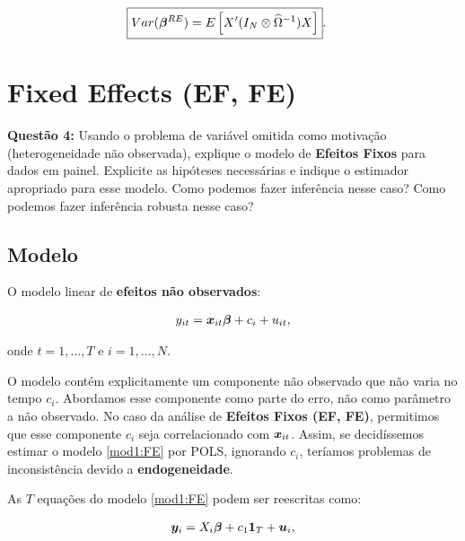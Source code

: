 \documentclass[11pt,oneside,a4paper]{article}
\numberwithin{equation}{section}
\begin{document}
\vspace{-1 em}
\begin{align*} 
	\Aboxed{
Var( \mbs{\beta}^{RE} ) = 
E
\left[ X' ( I_{N} \otimes \widehat{\Omega}^{-1} ) X \right] }.
\end{align*}

\clearpage
\section{Fixed Effects (EF, FE)}

\noindent
\textbf{Questão 4:}
Usando o problema de variável omitida como motivação (heterogeneidade não observada), explique o modelo de \textbf{Efeitos Fixos} para dados em painel.
Explicite as hipóteses necessárias e indique o estimador apropriado para esse modelo.
Como podemos fazer inferência nesse caso?
Como podemos fazer inferência robusta nesse caso?

\subsection*{Modelo}

O modelo linear de \textbf{efeitos não observados}:

\vspace{-1 em}
\begin{align} \label{mod1:FE}
	y_{it} = \boldsymbol{x}_{it} \boldsymbol{\beta} + c_{i} + u_{it},
\end{align}

\noindent
onde
$t = 1, \dots, T$ e $i = 1, \dots, N$.

O modelo contém explicitamente um componente não observado que não varia no tempo $c_{i}$.
Abordamos esse componente como parte do erro, não como parâmetro a não observado.
No caso da análise de \textbf{Efeitos Fixos (EF, FE)}, permitimos que esse componente $c_{i}$ seja correlacionado com $\boldsymbol{x}_{it}$.
Assim, se decidíssemos estimar o modelo \eqref{mod1:FE} por POLS, ignorando $c_{i}$, teríamos problemas de inconsistência devido a \textbf{endogeneidade}.

As $T$ equações do modelo \eqref{mod1:FE} podem ser reescritas como:

\vspace{-1 em}
\begin{align} \label{mod2:FE}
	\boldsymbol{y}_{i} = X_{i} \boldsymbol{\beta} + c_{1} \boldsymbol{1}_{T} + \boldsymbol{u}_{i},
\end{align}
\end{document}
